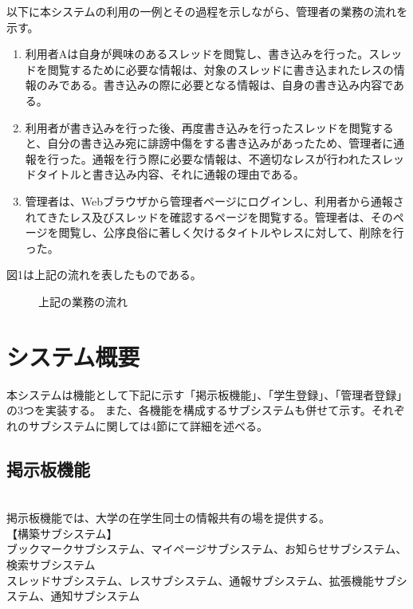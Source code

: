 \documentclass[a4j]{jarticle}
\begin{document}
以下に本システムの利用の一例とその過程を示しながら、管理者の業務の流れを示す。

\begin{enumerate}
  \item 利用者Aは自身が興味のあるスレッドを閲覧し、書き込みを行った。スレッドを閲覧するために必要な情報は、対象のスレッドに書き込まれたレスの情報のみである。書き込みの際に必要となる情報は、自身の書き込み内容である。

  \item  利用者が書き込みを行った後、再度書き込みを行ったスレッドを閲覧すると、自分の書き込み宛に誹謗中傷をする書き込みがあったため、管理者に通報を行った。通報を行う際に必要な情報は、不適切なレスが行われたスレッドタイトルと書き込み内容、それに通報の理由である。
  \item  管理者は、Webブラウザから管理者ページにログインし、利用者から通報されてきたレス及びスレッドを確認するページを閲覧する。管理者は、そのページを閲覧し、公序良俗に著しく欠けるタイトルやレスに対して、削除を行った。
\end{enumerate}

図1は上記の流れを表したものである。


\begin{figure}[h!]
\begin{center}
\caption{上記の業務の流れ}
\label{fig:figuretest}
\end{center}
\end{figure}














\section{システム概要}
本システムは機能として下記に示す「掲示板機能」、「学生登録」、「管理者登録」の3つを実装する。
 また、各機能を構成するサブシステムも併せて示す。それぞれのサブシステムに関しては4節にて詳細を述べる。

\subsection{掲示板機能}
\\掲示板機能では、大学の在学生同士の情報共有の場を提供する。
\\【構築サブシステム】
\\ ブックマークサブシステム、マイページサブシステム、お知らせサブシステム、検索サブシステム
\\ スレッドサブシステム、レスサブシステム、通報サブシステム、拡張機能サブシステム、通知サブシステム
\end{document}
